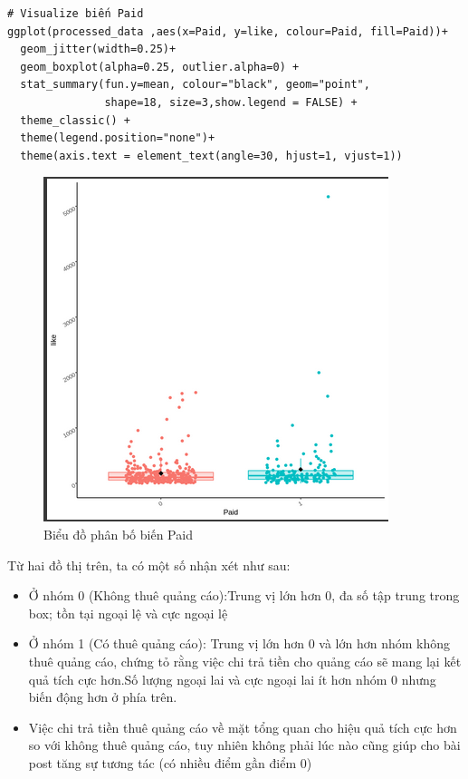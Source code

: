 \begin{itemize}
\begin{lstlisting}
# Visualize biến Paid
ggplot(processed_data ,aes(x=Paid, y=like, colour=Paid, fill=Paid))+
  geom_jitter(width=0.25)+
  geom_boxplot(alpha=0.25, outlier.alpha=0) +
  stat_summary(fun.y=mean, colour="black", geom="point",
               shape=18, size=3,show.legend = FALSE) +
  theme_classic() +
  theme(legend.position="none")+
  theme(axis.text = element_text(angle=30, hjust=1, vjust=1))
        \end{lstlisting}
            \begin{figure}[H]
                \centering
                \includegraphics[width=0.8\linewidth]{part23_figures/04.png}
                \caption{Biểu đồ phân bố biến Paid}
                \label{fig:Biểu đồ phân bố biến Paid}
            \end{figure}
        Từ hai đồ thị trên, ta có một số nhận xét như sau:\begin{itemize}
            \item Ở nhóm 0 (Không thuê quảng cáo):Trung vị lớn hơn 0, đa số tập trung trong box; tồn tại ngoại lệ và cực ngoại lệ
            \item Ở nhóm 1 (Có thuê quảng cáo): Trung vị lớn hơn 0 và lớn hơn nhóm không thuê quảng cáo, chứng tỏ rằng việc chi trả tiền cho quảng cáo sẽ mang lại kết quả tích cực hơn.Số lượng ngoại lai và cực ngoại lai ít hơn nhóm 0 nhưng biến động hơn ở phía trên.
            \item Việc chi trả tiền thuê quảng cáo về mặt tổng quan cho hiệu quả tích cực hơn so với không thuê quảng cáo, tuy nhiên không phải lúc nào cũng giúp cho bài post tăng sự tương tác (có nhiều điểm gần điểm 0)


\end{itemize}
\end{itemize}
